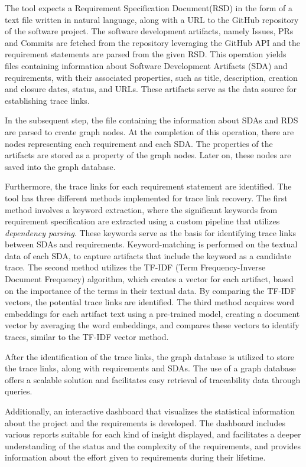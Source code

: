 \documentclass[conference]{IEEEtran}
\begin{document}
The tool expects a Requirement Specification Document(RSD) in the form of a text file written in natural language, along with a URL to the GitHub repository of the software project. The software development artifacts, namely Issues, PRs and Commits are fetched from the repository leveraging the GitHub API
and the requirement statements are parsed from the given RSD. This operation yields files containing information about Software Development Artifacts (SDA) and requirements, with their associated properties, such as title, description, creation and closure dates, status, and URLs. These artifacts serve as the data source for establishing trace links.

In the subsequent step, the file containing the information about SDAs and RDS are parsed to create graph nodes. At the completion of this operation, there are nodes representing each requirement and each SDA. The properties of the artifacts are stored as a property of the graph nodes. Later on, these nodes are saved into the graph database.

Furthermore, the trace links for each requirement statement are identified. The tool has three different methods implemented for trace link recovery. The first method involves a keyword extraction, where the significant keywords from requirement specification are extracted using a custom pipeline that utilizes \textit{dependency parsing}. These keywords serve as the basis for identifying trace links between SDAs and requirements. Keyword-matching is performed on the textual data of each SDA, to capture artifacts that include the keyword as a candidate trace. The second method utilizes the TF-IDF (Term Frequency-Inverse Document Frequency) algorithm, which creates a vector for each artifact, based on the importance of the terms in their textual data. By comparing the TF-IDF vectors, the potential trace links are identified. The third method acquires word embeddings for each artifact text using a pre-trained model, creating a document vector by averaging the word embeddings, and compares these vectors to identify traces, similar to the TF-IDF vector method. 

After the identification of the trace links, the graph database is utilized to store the trace links, along with requirements and SDAs. The use of a graph database offers a scalable solution and facilitates easy retrieval of traceability data through queries. 

Additionally, an interactive dashboard that visualizes the statistical information about the project and the requirements is developed. The dashboard includes various reports suitable for each kind of insight displayed, and facilitates a deeper understanding of the status and the complexity of the requirements, and provides information about the effort given to requirements during their lifetime.
\end{document}
